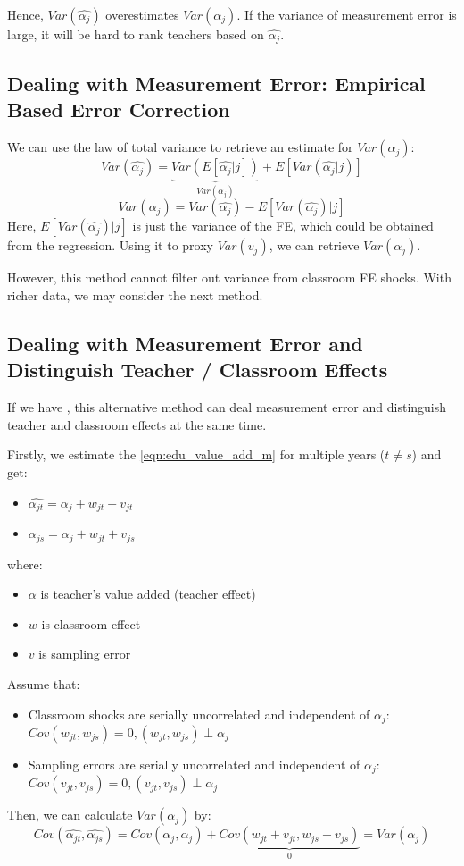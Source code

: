         Hence, $Var(\widehat{\alpha_j})$ overestimates $Var(\alpha_j)$. If the variance of measurement error is large, it will be hard to rank teachers based on $\widehat{\alpha_j}$.

    \subsection{Dealing with Measurement Error: Empirical Based Error Correction}

        We can use the law of total variance to retrieve an estimate for $Var(\alpha_j)$:
        $$Var(\widehat{\alpha_j})=\underbrace{Var(E[\widehat{\alpha_j}|j])}_{Var(\alpha_j)}+E[Var(\widehat{\alpha_j}|j)]$$
        $$Var(\alpha_j)=Var(\widehat{\alpha_j})-E[Var(\widehat{\alpha_j})|j]$$
        Here, $E[Var(\widehat{\alpha_j})|j]$ is just the variance of the FE, which could be obtained from the regression. Using it to proxy $Var(v_j)$, we can retrieve $Var(\alpha_j)$.
        
        However, this method cannot filter out variance from classroom FE shocks. With richer data, we may consider the next method.
        
    \subsection{Dealing with Measurement Error and Distinguish Teacher / Classroom Effects}

        If we have , this alternative method can deal measurement error and distinguish teacher and classroom effects at the same time.

        Firstly, we estimate the \ref{eqn:edu_value_add_m} for multiple years ($t \neq s$) and get:
        \begin{itemize}
            \item $\widehat{\alpha_{jt}}=\alpha_j + w_{jt} + v_{jt}$
            \item $\widehat{\alpha_{js}}=\alpha_j + w_{jt} + v_{js}$
        \end{itemize}
        where:
        \begin{itemize}
            \item $\alpha$ is teacher's value added (teacher effect)
            \item $w$ is classroom effect
            \item $v$ is sampling error
        \end{itemize}
        Assume that:
        \begin{itemize}
            \item Classroom shocks are serially uncorrelated and independent of $\alpha_j$: $Cov(w_{jt},w_{js})=0, (w_{jt},w_{js})\perp \alpha_j$
            \item Sampling errors are serially uncorrelated and independent of $\alpha_j$: $Cov(v_{jt},v_{js})=0, (v_{jt},v_{js})\perp \alpha_j$
        \end{itemize}
        Then, we can calculate $Var(\alpha_j)$ by:
        $$Cov(\widehat{\alpha_{jt}},\widehat{\alpha_{js}}) = Cov(\alpha_j,\alpha_j) + \underbrace{Cov(w_{jt}+v_{jt},w_{js}+v_{js})}_{0} = Var(\alpha_j)$$

